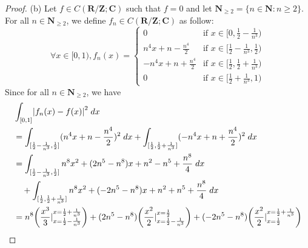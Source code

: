 \begin{proof}{(b)}
    Let \(f \in C(\mathbf{R} / \mathbf{Z} ; \mathbf{C})\) such that \(f = 0\) and let \(\mathbf{N}_{\geq 2} = \{n \in \mathbf{N} : n \geq 2\}\).
    For all \(n \in \mathbf{N}_{\geq 2}\), we define \(f_n \in C(\mathbf{R} / \mathbf{Z} ; \mathbf{C})\) as follow:
    \[
        \forall x \in [0, 1), f_n(x) = \begin{cases}
            0                          & \text{if } x \in [0, \frac{1}{2} - \frac{1}{n^3})           \\
            n^4 x + n - \frac{n^4}{2}  & \text{if } x \in [\frac{1}{2} - \frac{1}{n^3}, \frac{1}{2}) \\
            -n^4 x + n + \frac{n^4}{2} & \text{if } x \in [\frac{1}{2}, \frac{1}{2} + \frac{1}{n^3}) \\
            0                          & \text{if } x \in [\frac{1}{2} + \frac{1}{n^3}, 1)
        \end{cases}
    \]
    Since for all \(n \in \mathbf{N}_{\geq 2}\), we have
    \begin{align*}
         & \int_{[0, 1]} \abs*{f_n(x) - f(x)}^2 \; dx                                                                                                                                                                                                                                                        \\
         & = \int_{[\frac{1}{2} - \frac{1}{n^3}, \frac{1}{2}]} (n^4 x + n - \frac{n^4}{2})^2 \; dx + \int_{[\frac{1}{2}, \frac{1}{2} + \frac{1}{n^3}]} (-n^4 x + n + \frac{n^4}{2})^2 \; dx                                                                                                                  \\
         & = \int_{[\frac{1}{2} - \frac{1}{n^3}, \frac{1}{2}]} n^8 x^2 + (2n^5 - n^8) x + n^2 - n^5 + \frac{n^8}{4} \; dx                                                                                                                                                                                    \\
         & \quad + \int_{[\frac{1}{2}, \frac{1}{2} + \frac{1}{n^3}]} n^8 x^2 + (-2n^5 - n^8) x + n^2 + n^5 + \frac{n^8}{4} \; dx                                                                                                                                                                             \\
         & = n^8 \bigg(\frac{x^3}{3}|_{x = \frac{1}{2} - \frac{1}{n^3}}^{x = \frac{1}{2} + \frac{1}{n^3}}\bigg) + (2n^5 - n^8) \bigg(\frac{x^2}{2}|_{x = \frac{1}{2} - \frac{1}{n^3}}^{x = \frac{1}{2}}\bigg) + (-2n^5 - n^8) \bigg(\frac{x^2}{2}|_{x = \frac{1}{2}}^{x = \frac{1}{2} + \frac{1}{n^3}}\bigg) \\

\end{align*}
\end{proof}
